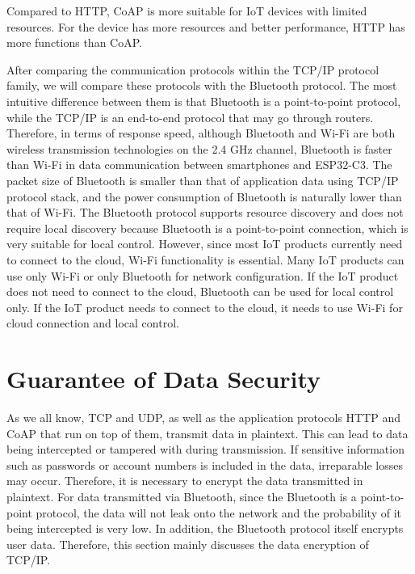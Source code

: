 \documentclass[a4paper,12pt,openany]{book}
\begin{document}
Compared to HTTP, CoAP is more suitable for IoT devices with limited resources. For the device has more resources and better performance, HTTP has more functions than CoAP.

After comparing the communication protocols within the TCP/IP protocol family, we will compare these protocols with the Bluetooth protocol. The most intuitive difference between them is that Bluetooth is a point-to-point protocol, while the TCP/IP is an end-to-end protocol that may go through routers. Therefore, in terms of response speed, although Bluetooth and Wi-Fi are both wireless transmission technologies on the 2.4 GHz channel, Bluetooth is faster than Wi-Fi in data communication between smartphones and ESP32-C3. The packet size of Bluetooth is smaller than that of application data using TCP/IP protocol stack, and the power consumption of Bluetooth is naturally lower than that of Wi-Fi. The Bluetooth protocol supports resource discovery and does not require local discovery because Bluetooth is a point-to-point connection, which is very suitable for local control. However, since most IoT products currently need to connect to the cloud, Wi-Fi functionality is essential. Many IoT products can use only Wi-Fi or only Bluetooth for network configuration. If the IoT product does not need to connect to the cloud, Bluetooth can be used for local control only. If the IoT product needs to connect to the cloud, it needs to use Wi-Fi for cloud connection and local control.

\section{Guarantee of Data Security}
As we all know, TCP and UDP, as well as the application protocols HTTP and CoAP that run on top of them, transmit data in plaintext. This can lead to data being intercepted or tampered with during transmission. If sensitive information such as passwords or account numbers is included in the data, irreparable losses may occur. Therefore, it is necessary to encrypt the data transmitted in plaintext. For data transmitted via Bluetooth, since the Bluetooth is a point-to-point protocol, the data will not leak onto the network and the probability of it being intercepted is very low. In addition, the Bluetooth protocol itself encrypts user data. Therefore, this section mainly discusses the data encryption of TCP/IP.
\end{document}
